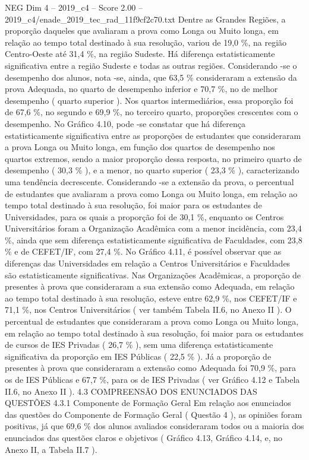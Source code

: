 \begin{textsample}{NEG Dim 4 – 2019\_c4 – Score 2.00 – 2019\_c4/enade\_2019\_tec\_rad\_11f9cf2c70.txt}
Dentre as Grandes Regiões, a proporção daqueles que avaliaram a prova como Longa ou Muito longa, em relação ao tempo total destinado à sua resolução, variou de 19,0 \%, na região Centro-Oeste até 31,4 \%, na região Sudeste.
Há diferença estatisticamente significativa entre a região Sudeste e todas as outras regiões.
Considerando -se o desempenho dos alunos, nota -se, ainda, que 63,5 \% consideraram a extensão da prova Adequada, no quarto de desempenho inferior e 70,7 \%, no de melhor desempenho ( quarto superior ).
Nos quartos intermediários, essa proporção foi de 67,6 \%, no segundo e 69,9 \%, no terceiro quarto, proporções crescentes com o desempenho.
No Gráfico 4.10, pode -se constatar que há diferença estatisticamente significativa entre as proporções de estudantes que consideraram a prova Longa ou Muito longa, em função dos quartos de desempenho nos quartos extremos, sendo a maior proporção dessa resposta, no primeiro quarto de desempenho ( 30,3 \% ), e a menor, no quarto superior ( 23,3 \% ), caracterizando uma tendência decrescente.
Considerando -se a extensão da prova, o percentual de estudantes que avaliaram a prova como Longa ou Muito longa, em relação ao tempo total destinado à sua resolução, foi maior para os estudantes de Universidades, para os quais a proporção foi de 30,1 \%, enquanto os Centros Universitários foram a Organização Acadêmica com a menor incidência, com 23,4 \%, ainda que sem diferença estatisticamente significativa de Faculdades, com 23,8 \% e de CEFET/IF, com 27,4 \%.
No Gráfico 4.11, é possível observar que as diferenças das Universidades em relação a Centros Universitários e Faculdades são estatisticamente significativas.
Nas Organizações Acadêmicas, a proporção de presentes à prova que consideraram a sua extensão como Adequada, em relação ao tempo total destinado à sua resolução, esteve entre 62,9 \%, nos CEFET/IF e 71,1 \%, nos Centros Universitários ( ver também Tabela II.6, no Anexo II ).
O percentual de estudantes que consideraram a prova como Longa ou Muito longa, em relação ao tempo total destinado à sua resolução, foi maior para os estudantes de cursos de IES Privadas ( 26,7 \% ), sem uma diferença estatisticamente significativa da proporção em IES Públicas ( 22,5 \% ).
Já a proporção de presentes à prova que consideraram a extensão como Adequada foi 70,9 \%, para os de IES Públicas e 67,7 \%, para os de IES Privadas ( ver Gráfico 4.12 e Tabela II.6, no Anexo II ). 4.3 COMPREENSÃO DOS ENUNCIADOS DAS QUESTÕES 4.3.1 Componente de Formação Geral Em relação aos enunciados das questões do Componente de Formação Geral ( Questão 4 ), as opiniões foram positivas, já que 69,6 \% dos alunos avaliados consideraram todos ou a maioria dos enunciados das questões claros e objetivos ( Gráfico 4.13, Gráfico 4.14, e, no Anexo II, a Tabela II.7 ).

\end{textsample}
